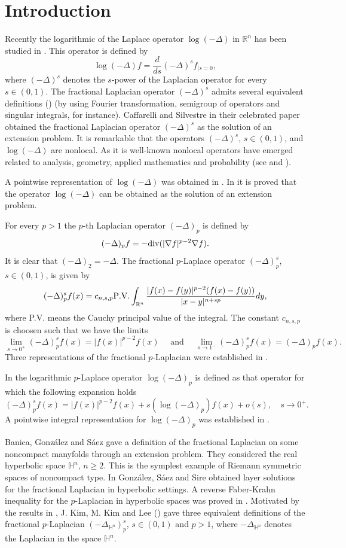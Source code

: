 \documentclass[a4paper,10pt, reqno]{amsart}
\theoremstyle{definition}
\theoremstyle{remark}
\numberwithin{equation}{section}
\begin{document}
\section{Introduction}
Recently the logarithmic of the Laplace operator $\log(-\Delta)$ in $\mathbb R^n$ has been studied in \cite{CW}. This operator is defined by
$$
\log (-\Delta )f=\frac{d}{ds}(-\Delta)^sf_{|s=0},
$$
where $(-\Delta)^s$ denotes the $s$-power of the Laplacian operator for every $s\in (0,1)$. The fractional Laplacian operator $(-\Delta)^s$ admits several equivalent definitions (\cite{KW}) (by using Fourier transformation, semigroup of operators and singular integrals, for instance). Caffarelli and Silvestre in their celebrated paper \cite{CS} obtained the fractional Laplacian operator $(-\Delta)^s$ as the solution of an extension problem. It is remarkable that the operators $(-\Delta)^s$, $s\in (0,1)$, and $\log(-\Delta)$ are nonlocal. As it is well-known nonlocal operators have emerged related to analysis, geometry, applied mathematics and probability (see \cite{JX, LPW, L, RS} and \cite{SV}).

A pointwise representation of $\log (-\Delta)$ was obtained in \cite[Theorem 1.1]{CW}. In \cite[Theorem 1.2]{CHW} it is proved that the operator $\log (-\Delta)$ can be obtained as the solution of an extension problem. 

For every $p>1$ the $p$-th Laplacian operator $(-\Delta)_p$ is defined by 
$$
(-\Delta)_pf=-{\rm div} (|\nabla f|^{p-2}\nabla f).
$$
It is clear that $(-\Delta)_2=-\Delta$. The fractional $p$-Laplace operator $(-\Delta)_p^s$, $s\in (0,1)$, is given by
$$
(-\Delta)_p^sf(x)=c_{n,s,p}{\rm P.V.}\int_{\mathbb R^n}\frac{|f(x)-f(y)|^{p-2}(f(x)-f(y))}{|x-y|^{n+sp}}dy,
$$
where P.V. means the Cauchy principal value of the integral. The constant $c_{n,s,p}$ is choosen such that we have the limits
$$
\lim_{s\rightarrow 0^+}(-\Delta)_p^sf(x)=|f(x)|^{p-2}f(x)\quad \mbox{ and }\quad \lim_{s\rightarrow 1^-}(-\Delta )_p^sf(x)=(-\Delta)_pf(x).
$$
Three representations of the fractional $p$-Laplacian were established in \cite[Theorems 2.1, 3.1, and 4.1]{TGV}.

In \cite{DJF} the logarithmic $p$-Laplace operator $\log (-\Delta )_p$ is defined as that operator for which the following expansion holds
$$
(-\Delta)_p^sf(x)=|f(x)|^{p-2}f(x)+s(\log (-\Delta)_p)f(x)+o(s),\quad s\rightarrow 0^+.
$$
A pointwise integral representation for $\log (-\Delta )_p$ was established in \cite[Theorem 1.1]{DJF}.

Banica, Gonz\'alez and S\'aez gave a definition of the fractional Laplacian on some noncompact manyfolds through an extension problem. They considered the real hyperbolic space $\mathbb H^n$, $n\geq 2$. This is the symplest example of Riemann symmetric spaces of noncompact type. In \cite{GSS} Gonz\'alez, S\'aez and Sire obtained layer solutions for the fractional Laplacian in hyperbolic settings. A reverse Faber-Krahn inequality for the $p$-Laplacian in hyperbolic spaces was proved in \cite[Theorem 1.4]{GV}. Motivated by the results in \cite{TGV}, J. Kim, M. Kim and Lee (\cite{KKL}) gave three equivalent definitions of the fractional $p$-Laplacian $(-\Delta_{\mathbb H^n})_p^s$, $s\in (0,1)$ and $p>1$, where $-\Delta_{\mathbb H^n}$ denotes the Laplacian in the space $\mathbb H^n$. 
\end{document}
